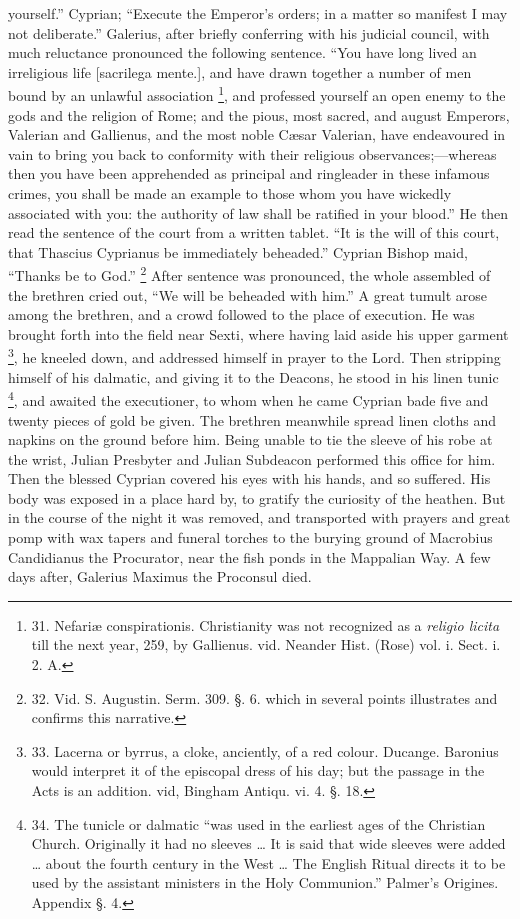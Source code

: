 yourself.'' Cyprian; ``Execute the Emperor's orders; in a matter so
manifest I may not deliberate.'' Galerius, after briefly conferring
with his judicial council, with much reluctance pronounced the
following sentence. ``You have long lived an irreligious life [sacrilega
mente.], and have drawn together a number of men bound by an unlawful
association \footnote{31.
Nefariæ conspirationis. Christianity was not recognized as a \emph{religio
licita} till the next year, 259, by Gallienus. vid. Neander Hist.
(Rose) vol. i. Sect. i. 2. A.}, and
professed yourself an open enemy to the gods and the religion
of Rome; and the pious, most sacred, and august Emperors, Valerian and
Gallienus, and the most noble Cæsar Valerian, have endeavoured in
vain to bring you back to conformity with their religious
observances;—whereas then you have been apprehended as principal and
ringleader in these infamous crimes, you shall be made an example to
those whom you have wickedly associated with you: the authority of law
shall be ratified in your blood.'' He then read the sentence of the
court from a written tablet. ``It is the will of this court, that
Thascius Cyprianus be immediately beheaded.'' Cyprian Bishop maid, ``Thanks
be to God.'' \footnote{32. Vid.
S. Augustin. Serm. 309. §. 6. which in several points illustrates and
confirms this narrative.} After
sentence was pronounced, the whole assembled of the brethren cried
out, ``We will be beheaded with him.'' A great tumult arose among the
brethren, and a crowd followed to the place of execution. He was
brought forth into the field near Sexti, where having laid aside his
upper garment \footnote{33.
Lacerna or byrrus, a cloke, anciently, of a red colour. Ducange.
Baronius would interpret it of the episcopal dress of his day; but the
passage in the Acts is an addition. vid, Bingham Antiqu. vi. 4. §.
18.}, he
kneeled down, and addressed himself in prayer to the Lord. Then
stripping himself of his dalmatic, and giving it to the Deacons, he
stood in his linen tunic \footnote{34. The
tunicle or dalmatic ``was used in the earliest ages of the Christian
Church. Originally it had no sleeves …
It is said that wide sleeves were added … about the fourth century
in the West … The English Ritual directs it to be used by the
assistant ministers in the Holy Communion.'' Palmer's Origines.
Appendix §. 4.},
and awaited the executioner, to whom when he came Cyprian bade five
and twenty pieces of gold be given. The brethren meanwhile spread
linen cloths and napkins on the ground before him. Being unable to tie
the sleeve of his robe at the wrist, Julian Presbyter and Julian
Subdeacon performed this office for him. Then the blessed Cyprian
covered his eyes with his hands, and so suffered. His body was exposed
in a place hard by, to gratify the curiosity of the heathen. But in
the course of the night it was removed, and transported with prayers
and great pomp with wax tapers and funeral torches to the burying
ground of Macrobius Candidianus the Procurator, near the fish ponds in
the Mappalian Way. A few days after, Galerius Maximus the Proconsul
died.

